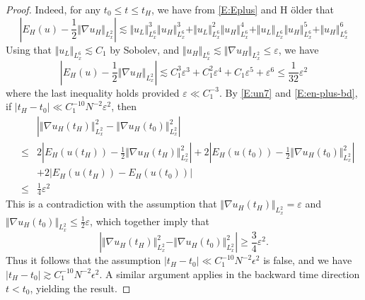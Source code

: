 \documentclass[12pt,letterpaper,leqno]{amsart}
\theoremstyle{plain}
\numberwithin{equation}{section}
\numberwithin{theorem}{section}
\numberwithin{proposition}{section}
\numberwithin{lemma}{section}
\numberwithin{corollary}{section}
\begin{document}
\begin{proof}
Indeed, for any $t_{0}\leq t\leq t_{H}$, we have from \eqref{E:Eplus} and H%
\"{o}lder that 
\begin{equation*}
\left\vert E_{H}(u)-\frac{1}{2}\Vert \nabla u_{H}\Vert
_{L_{x}^{2}}\right\vert \lesssim \Vert u_{L}\Vert _{L_{x}^{6}}^{3}\Vert
u_{H}\Vert _{L_{x}^{6}}^{3}+\Vert u_{L}\Vert _{L_{x}^{6}}^{2}\Vert
u_{H}\Vert _{L_{x}^{6}}^{4}+\Vert u_{L}\Vert _{L_{x}^{6}}\Vert u_{H}\Vert
_{L_{x}^{6}}^{5}+\Vert u_{H}\Vert _{L_{x}^{6}}^{6}
\end{equation*}%
Using that $\Vert u_{L}\Vert _{L_{x}^{6}}\lesssim C_{1}$ by Sobolev, and $%
\Vert u_{H}\Vert _{L_{x}^{6}}\lesssim \Vert \nabla u_{H}\Vert
_{L_{x}^{2}}\leq \varepsilon $, we have 
\begin{equation}
\left\vert E_{H}(u)-\frac{1}{2}\Vert \nabla u_{H}\Vert
_{L_{x}^{2}}\right\vert \lesssim C_{1}^{3}\varepsilon
^{3}+C_{1}^{2}\varepsilon ^{4}+C_{1}\varepsilon ^{5}+\varepsilon
^{6}\leqslant \frac{1}{32}\varepsilon ^{2}  \label{E:un7}
\end{equation}%
where the last inequality holds provided $\varepsilon \ll C_{1}^{-3}$. By %
\eqref{E:un7} and \eqref{E:en-plus-bd}, if $|t_{H}-t_{0}|\ll
C_{1}^{-10}N^{-2}\varepsilon ^{2}$, then%
\begin{eqnarray*}
&&\left\vert \left\Vert \nabla u_{H}(t_{H})\right\Vert
_{L_{x}^{2}}^{2}-\left\Vert \nabla u_{H}(t_{0})\right\Vert
_{L_{x}^{2}}^{2}\right\vert \\
&\leqslant &2\left\vert E_{H}(u(t_{H}))-\tfrac{1}{2}\Vert \nabla
u_{H}(t_{H})\Vert _{L_{x}^{2}}^{2}\right\vert +2\left\vert E_{H}(u(t_{0}))-%
\tfrac{1}{2}\Vert \nabla u_{H}(t_{0})\Vert _{L_{x}^{2}}^{2}\right\vert \\
&&+2\left\vert E_{H}(u(t_{H}))-E_{H}(u(t_{0}))\right\vert \\
&\leqslant &\tfrac{1}{4}\varepsilon ^{2}
\end{eqnarray*}
This is a contradiction with the assumption that $\Vert \nabla
u_{H}(t_{H})\Vert _{L_{x}^{2}}=\varepsilon $ and $\Vert \nabla
u_{H}(t_{0})\Vert _{L_{x}^{2}}\leqslant \frac{1}{2}\varepsilon $, which
together imply that 
\begin{equation*}
\left\vert \Vert \nabla u_{H}(t_{H})\Vert _{L_{x}^{2}}^{2}-\Vert \nabla
u_{H}(t_{0})\Vert _{L_{x}^{2}}^{2}\right\vert \geqslant \frac{3}{4}%
\varepsilon ^{2}.
\end{equation*}
Thus it follows that the assumption $\left\vert t_{H}-t_{0}\right\vert \ll
C_{1}^{-10}N^{-2}\epsilon ^{2}$ is false, and we have $\left\vert
t_{H}-t_{0}\right\vert \gtrsim C_{1}^{-10}N^{-2}\epsilon ^{2}$. A similar
argument applies in the backward time direction $t<t_{0}$, yielding the
result.


\end{proof}
\end{document}
